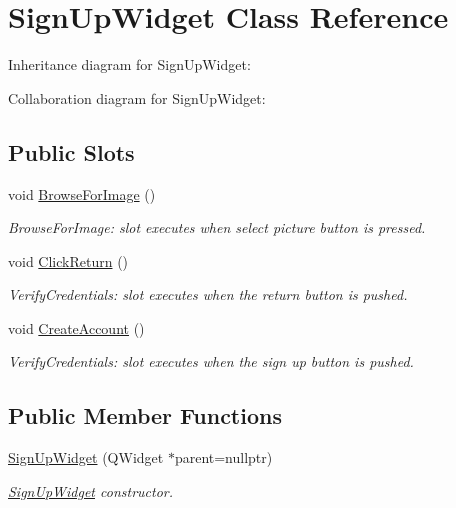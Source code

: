 \hypertarget{classSignUpWidget}{}\section{Sign\+Up\+Widget Class Reference}
\label{classSignUpWidget}


Inheritance diagram for Sign\+Up\+Widget\+:


Collaboration diagram for Sign\+Up\+Widget\+:
\subsection*{Public Slots}
\begin{DoxyCompactItemize}
\item 
void \hyperlink{classSignUpWidget_ae0de34039f7e05bb8901c84533e5a160}{Browse\+For\+Image} ()
\begin{DoxyCompactList}\small\item\em Browse\+For\+Image\+: slot executes when select picture button is pressed. \end{DoxyCompactList}\item 
void \hyperlink{classSignUpWidget_ab4af9be338fd97119fe6e01234da8a80}{Click\+Return} ()
\begin{DoxyCompactList}\small\item\em Verify\+Credentials\+: slot executes when the return button is pushed. \end{DoxyCompactList}\item 
void \hyperlink{classSignUpWidget_af5d2a451a5552737ccdb9c14b5a75ad5}{Create\+Account} ()
\begin{DoxyCompactList}\small\item\em Verify\+Credentials\+: slot executes when the sign up button is pushed. \end{DoxyCompactList}\end{DoxyCompactItemize}
\subsection*{Public Member Functions}
\begin{DoxyCompactItemize}
\item 
\hyperlink{classSignUpWidget_aa6ee3a3bcdfe86cc64a340ffdcc64088}{Sign\+Up\+Widget} (Q\+Widget $\ast$parent=nullptr)
\begin{DoxyCompactList}\small\item\em \hyperlink{classSignUpWidget}{Sign\+Up\+Widget} constructor. \end{DoxyCompactList}\end{DoxyCompactItemize}
